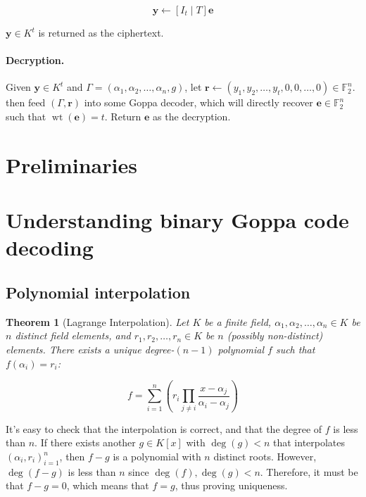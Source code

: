 \documentclass{article}
\newtheorem{theorem}{Theorem}[section]
\begin{document}
$$\mathbf{y} \leftarrow [I_t \mid T] \mathbf{e}$$

$\mathbf{y} \in K^t$ is returned as the ciphertext.

\paragraph{Decryption.} Given $\mathbf{y} \in K^t$ and $\Gamma = (\alpha_1, \alpha_2, \ldots, \alpha_n, g)$, let $\mathbf{r} \leftarrow (y_1, y_2, \ldots, y_t, 0, 0, \ldots, 0) \in \mathbb{F}_2^n$. then feed $(\Gamma, \mathbf{r})$ into some Goppa decoder, which will directly recover $\mathbf{e} \in \mathbb{F}_2^n$ such that $\mathop{wt}(\mathbf{e}) = t$. Return $\mathbf{e}$ as the decryption.

\section{Preliminaries}

\section{Understanding binary Goppa code decoding}
\subsection{Polynomial interpolation}

\begin{theorem}[Lagrange Interpolation]\label{thm:lagrange-interpolation}
    Let $K$ be a finite field, $\alpha_1, \alpha_2, \ldots, \alpha_n \in K$ be $n$ distinct field elements, and $r_1, r_2, \ldots, r_n \in K$ be $n$ (possibly non-distinct) elements. There exists a unique degree-$(n-1)$ polynomial $f$ such that $f(\alpha_i) = r_i$:

    \begin{equation*}
        f = \sum_{i=1}^n\left(
            r_i \prod_{j \neq i}\frac{x - \alpha_j}{\alpha_i - \alpha_j}
        \right)
    \end{equation*}
\end{theorem}

It's easy to check that the interpolation is correct, and that the degree of $f$ is less than $n$. If there exists another $g \in K[x]$ with $\deg(g) < n$ that interpolates $(\alpha_i, r_i)_{i=1}^n$, then $f - g$ is a polynomial with $n$ distinct roots. However, $\deg(f-g)$ is less than $n$ since $\deg(f), \deg(g) < n$. Therefore, it must be that $f-g = 0$, which means that $f = g$, thus proving uniqueness.
\end{document}
